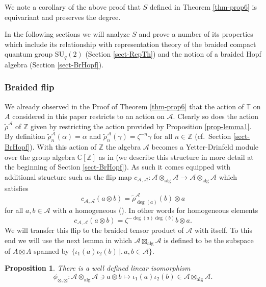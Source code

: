 \documentclass[12pt,reqno,a4paper]{amsart}
\newtheorem{proposition}{Proposition}[section]
\theoremstyle{definition}
\newcommand{\tens}{\otimes}
\newcommand{\algtens}{\otimes_{\textrm{alg}}}
\newcommand{\algboxtimes}{\boxtimes_{\textrm{alg}}}
\newcommand{\CC}{\mathbb{C}}
\newcommand{\TT}{\mathbb{T}}
\newcommand{\ZZ}{\mathbb{Z}}
\newcommand{\cA}{\mathscr{A}}
\newcommand{\SU}{\mathrm{SU}}
\numberwithin{equation}{section}
\begin{document}
We note a corollary of the above proof that $S$ defined in Theorem \ref{thm-prop6} is equivariant and preserves the degree.

In the following sections we will analyze $S$ and prove a number of its properties which include its relationship with representation theory of the braided compact quantum group $\SU_q(2)$ (Section \ref{sect-RepTh}) and the notion of a braided Hopf algebra (Section \ref{sect-BrHopf}).

\subsubsection{Braided flip}\label{sect-BrFlip}

We already observed in the Proof of Theorem \ref{thm-prop6} that the action of $\TT$ on $A$ considered in this paper restricts to an action on $\cA$. Clearly so does the action $\tilde{\rho}^\cA$ of $\ZZ$ given by restricting the action provided by Proposition \ref{prop-lemma1}. By definition $\tilde{\rho}^\cA_n(\alpha)=\alpha$ and $\tilde{\rho}^\cA_n(\gamma)=\zeta^{-n}\gamma$ for all $n\in\ZZ$ (cf.~Section \ref{sect-BrHopf}). With this action of $\ZZ$ the algebra $\cA$ becomes a Yetter-Drinfeld module over the group algebra $\CC[\ZZ]$ as in \cite[Definition 1.4.1]{HeckenbergerSchneider} (we describe this structure in more detail at the beginning of Section \ref{sect-BrHopf}). As such it comes equipped with additional structure such as the flip map $c_{\cA,\cA}\colon\cA\algtens\cA\to\cA\algtens\cA$ which satisfies
\[
c_{\cA,\cA}(a\tens b)=\tilde{\rho}^\cA_{\deg(a)}(b)\tens a
\]
for all $a,b\in\cA$ with $a$ homogeneous (\cite[Definition 1.4.10]{HeckenbergerSchneider}). In other words for homogeneous elements
\begin{equation}\label{eq-BrFlip}
c_{\cA,\cA}(a\tens b)=\zeta^{-\deg(a)\deg(b)}b\tens a.
\end{equation}
We will transfer this flip to the braided tensor product of $\cA$ with itself. To this end we will use the next lemma in which $\cA\algboxtimes\cA$ is defined to be the subspace of $A\boxtimes A$ spanned by $\bigl\{\iota_1(a)\iota_2(b)\,\bigr|\bigl.\,a,b\in\cA\bigr\}$.

\begin{proposition}\label{prop-lemma10}
There is a well defined linear isomorphism
\begin{equation}\label{eq42}
\phi_{\tens,\boxtimes}\colon\cA\algtens\cA\ni a\tens b\longmapsto\iota_1(a)\iota_2(b)\in\cA\algboxtimes\cA.
\end{equation}
\end{proposition}
\end{document}
